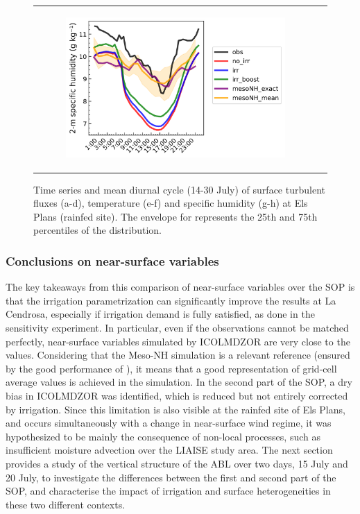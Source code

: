 \begin{figure}[hbtp]
\begin{tabular}{cc}
\begin{subfigure}[t]{0.5\textwidth}
            \includegraphics[width=\textwidth]{images/chap6/SOP_TS_DC/diurnal_cycle_elsplans_q2m.png}
        \end{subfigure}
    \end{tabular}
    \caption{Time series and mean diurnal cycle (14-30 July) of surface turbulent fluxes (a-d), temperature (e-f) and specific humidity (g-h) at Els Plans (rainfed site). The envelope for \mesomean represents the 25th and 75th percentiles of the distribution.}
    \label{fig:elsplans_surfacevars}
\end{figure}

\subsubsection*{Conclusions on near-surface variables}
The key takeaways from this comparison of near-surface variables over the SOP is that the irrigation parametrization can significantly improve the results at La Cendrosa, especially if irrigation demand is fully satisfied, as done in the \irrboost sensitivity experiment.
In particular, even if the observations cannot be matched perfectly, near-surface variables simulated by ICOLMDZOR are very close to the \mesomean values. Considering that the Meso-NH simulation is a relevant reference (ensured by the good performance of \mesoexact), it means that a good representation of grid-cell average values is achieved in the \irrboost simulation. 
In the second part of the SOP, a dry bias in ICOLMDZOR was identified, which is reduced but not entirely corrected by irrigation. Since this limitation is also visible at the rainfed site of Els Plans, and occurs simultaneously with a change in near-surface wind regime, it was hypothesized to be mainly the consequence of non-local processes, such as insufficient moisture advection over the LIAISE study area. The next section provides a study of the vertical structure of the ABL over two days, 15 July and 20 July, to investigate the differences between the first and second part of the SOP, and characterise the impact of irrigation and surface heterogeneities in these two different contexts.

